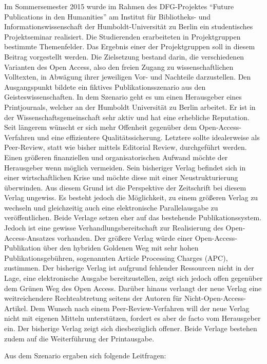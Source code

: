 \documentclass[a4paper,
fontsize=11pt,
oneside,
numbers=noperiodatend,
parskip=half-,
bibliography=totoc,
final
]{scrartcl}
\begin{document}
Im Sommersemester 2015 wurde im Rahmen des DFG-Projektes \enquote{Future
Publications in den Humanities} am Institut für Bibliotheks- und
Informationswissenschaft der Humboldt-Universität zu Berlin ein
studentisches Projektseminar realisiert. Die Studierenden erarbeiteten
in Projektgruppen bestimmte Themenfelder. Das Ergebnis einer der
Projektgruppen soll in diesem Beitrag vorgestellt werden. Die
Zielsetzung bestand darin, die verschiedenen Varianten des Open Access,
also den freien Zugang zu wissenschaftlichen Volltexten, in Abwägung
ihrer jeweiligen Vor- und Nachteile darzustellen. Den Ausgangspunkt
bildete ein fiktives Publikationsszenario aus den Geisteswissenschaften.
In dem Szenario geht es um einen Herausgeber eines Printjournals,
welcher an der Humboldt Universität zu Berlin arbeitet. Er ist in der
Wissenschaftsgemeinschaft sehr aktiv und hat eine erhebliche Reputation.
Seit längerem wünscht er sich mehr Offenheit gegenüber dem
Open-Access-Verfahren und eine effizientere Qualitätssicherung. Letztere
sollte idealerweise als Peer-Review, statt wie bisher mittels Editorial
Review, durchgeführt werden. Einen größeren finanziellen und
organisatorischen Aufwand möchte der Herausgeber wenn möglich vermeiden.
Sein bisheriger Verlag befindet sich in einer wirtschaftlichen Krise und
möchte diese mit einer Neustrukturierung überwinden. Aus diesem Grund
ist die Perspektive der Zeitschrift bei diesem Verlag ungewiss. Es
besteht jedoch die Möglichkeit, zu einem größeren Verlag zu wechseln und
gleichzeitig auch eine elektronische Parallelausgabe zu veröffentlichen.
Beide Verlage setzen eher auf das bestehende Publikationssystem. Jedoch
ist eine gewisse Verhandlungsbereitschaft zur Realisierung des
Open-Access-Ansatzes vorhanden. Der größere Verlag würde einer
Open-Access-Publikation über den hybriden Goldenen Weg mit sehr hohen
Publikationsgebühren, sogenannten Article Processing Charges (APC),
zustimmen. Der bisherige Verlag ist aufgrund fehlender Ressourcen nicht
in der Lage, eine elektronische Ausgabe bereitzustellen, zeigt sich
jedoch offen gegenüber dem Grünen Weg des Open Access. Darüber hinaus
verlangt der neue Verlag eine weitreichendere Rechteabtretung seitens
der Autoren für Nicht-Open-Access-Artikel. Dem Wunsch nach einem
Peer-Review-Ver\-fahr\-en will der neue Verlag nicht mit eigenen Mitteln
unterstützen, fordert es aber de facto vom Herausgeber ein. Der
bisherige Verlag zeigt sich diesbezüglich offener. Beide Verlage
bestehen zudem auf die Weiterführung der Printausgabe.

Aus dem Szenario ergaben sich folgende Leitfragen:
\end{document}
